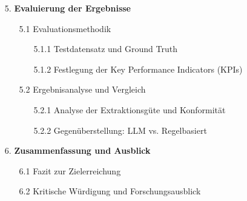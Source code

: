 \begin{itemize}
    \item[5.] \textbf{Evaluierung der Ergebnisse}
    \begin{itemize}
        \item[5.1] Evaluationsmethodik
        \begin{itemize}
            \item[5.1.1] Testdatensatz und Ground Truth
            \item[5.1.2] Festlegung der Key Performance Indicators (KPIs)
        \end{itemize}
        \item[5.2] Ergebnisanalyse und Vergleich
        \begin{itemize}
            \item[5.2.1] Analyse der Extraktionsgüte und Konformität
            \item[5.2.2] Gegenüberstellung: LLM vs. Regelbasiert
        \end{itemize}
    \end{itemize}
    
    \item[6.] \textbf{Zusammenfassung und Ausblick}
    \begin{itemize}
        \item[6.1] Fazit zur Zielerreichung
        \item[6.2] Kritische Würdigung und Forschungsausblick
    \end{itemize}
\end{itemize}

\clearpage

